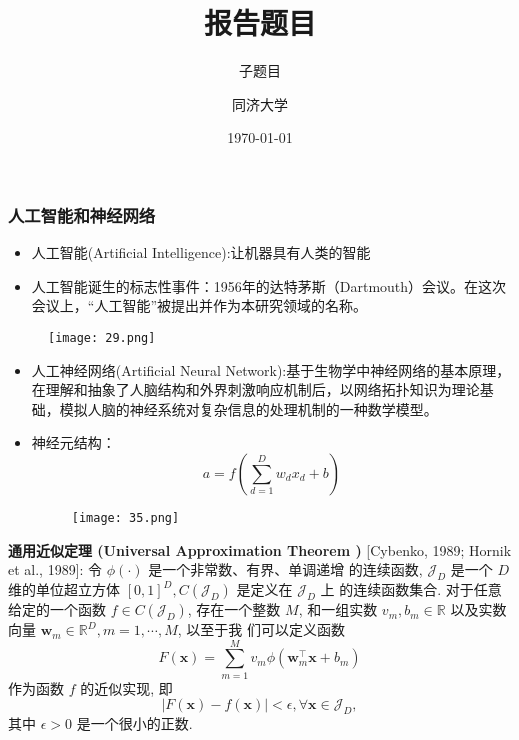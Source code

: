 \documentclass[CJK,aspectratio=169]{beamer}  %
\begin{document}
	
	\title{报告题目}
	\subtitle{子题目}
	\author{同济大学}
	\date{\today}
	
	\begin{frame}
		\vspace{0.5cm}
		\titlepage 
		\hypertarget{beginning}{}
	\end{frame}
	\begin{frame}
		\frametitle{人工智能和神经网络}
		\begin{itemize}
			\item 人工智能(Artificial Intelligence):让机器具有人类的智能
			\item 人工智能诞生的标志性事件：1956年的达特茅斯（Dartmouth）会议。在这次会议上，“人工智能”被提出并作为本研究领域的名称。
			
		\end{itemize}
		\begin{figure}
			\centering
			\texttt{[image: 29.png]}
		\end{figure}
	\end{frame}
	\begin{frame}
		\begin{itemize}
			\item 人工神经网络(Artificial Neural Network):基于生物学中神经网络的基本原理，在理解和抽象了人脑结构和外界刺激响应机制后，以网络拓扑知识为理论基础，模拟人脑的神经系统对复杂信息的处理机制的一种数学模型。
			\item 神经元结构：
			$$a=f(\sum_{d=1}^{D}w_dx_d+b)$$
			\begin{figure}
				\centering
				\texttt{[image: 35.png]}
			\end{figure}
			
		\end{itemize}
	\end{frame}
	\begin{frame}
		\begin{theorem}
			\textbf{通用近似定理 (Universal Approximation Theorem )} [Cybenko, 1989; Hornik et al., 1989]: 令 $\phi(\cdot)$ 是一个非常数、有界、单调递增 的连续函数, $\mathcal{J}_D$ 是一个 $D$ 维的单位超立方体 $[0,1]^D, C\left(\mathcal{J}_D\right)$ 是定义在 $\mathcal{J}_D$ 上 的连续函数集合. 对于任意给定的一个函数 $f \in C\left(\mathcal{J}_D\right)$, 存在一个整数 $M$, 和一组实数 $v_m, b_m \in \mathbb{R}$ 以及实数向量 $\boldsymbol{w}_m \in \mathbb{R}^D, m=1, \cdots, M$, 以至于我 们可以定义函数
			$$
			F(\boldsymbol{x})=\sum_{m=1}^M v_m \phi\left(\boldsymbol{w}_m^{\top} \boldsymbol{x}+b_m\right)
			$$
			作为函数 $f$ 的近似实现, 即
			$$
			|F(\boldsymbol{x})-f(\boldsymbol{x})|<\epsilon, \forall \boldsymbol{x} \in \mathcal{J}_D,
			$$
			其中 $\epsilon>0$ 是一个很小的正数.
		\end{theorem}
	\end{frame}
\end{document}
